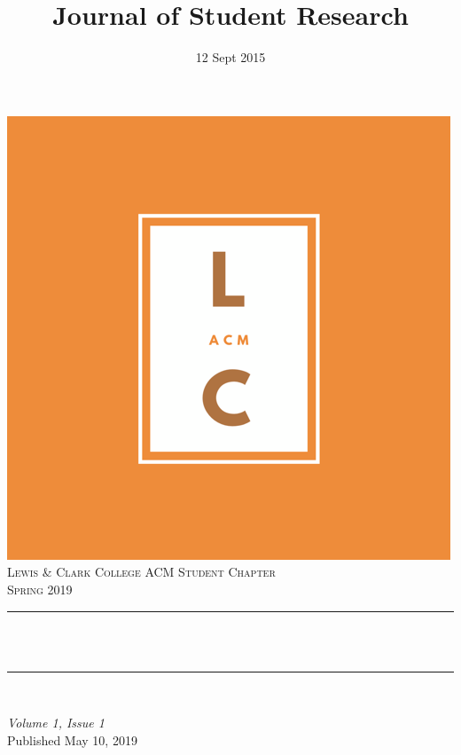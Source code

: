 \documentclass[12pt]{article}
\title{Journal of Student Research}								%
\author{ }								%
\date{12 Sept 2015}											%
\makeatletter
\let\thetitle\@title
\makeatother
\begin{document}

\begin{titlepage}
	\centering
    \vspace*{0.5 cm}
    \includegraphics[scale = 0.4]{logo.png}\\[1.0 cm]	%
    \textsc{\LARGE Lewis \& Clark College ACM Student Chapter}\\[2.0 cm]	%
	\textsc{\Large Spring 2019}\\[0.5 cm]				%
	\rule{\linewidth}{0.2 mm} \\[0.4 cm]
	{ \huge \bfseries \thetitle}\\
	\rule{\linewidth}{0.2 mm} \\[1.5 cm]
	
	\begin{minipage}{0.4\textwidth}
		\begin{flushleft} \large
			\emph{Volume 1, Issue 1}\\
			Published May 10, 2019\\
			
          \end{flushleft}
			\end{minipage}
        

\end{titlepage}
\end{document}
